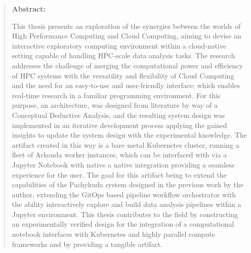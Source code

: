 \begin{abstract}
    \thispagestyle{kapitelkopfzeile}
    \textbf{Abstract:}

    This thesis presents an exploration of the synergies between the worlds of High
    Performance Computing and Cloud Computing, aiming to devise an interactive
    exploratory computing environment within a cloud-native setting capable of
    handling HPC-scale data analysis tasks.
    The research addresses the challenge of merging the computational power and
    efficiency of HPC systems with the versatility and flexibility of Cloud Computing
    and the need for an  easy-to-use and user-friendly interface;
    which enables real-time research in a familiar programming environment.
    For this purpose, an architecture, was designed from literature by way of
    a Conceptual Deductive Analysis, and the resulting system design was implemented
    in an iterative development process applying the gained insights to update
    the system design with the experimental knowledge.
    The artifact created in this way is a bare metal Kubernetes cluster, running
    a fleet of Arkouda worker instances, which can be interfaced with via a
    Jupyter Notebook with native a native integration providing a seamless
    experience for the user.
    The goal for this artifact being to extend the capabilities of the Pachykuda
    system designed in the previous work by the author, extending the
    GitOps based pipeline workflow orchestrator with the ability interactively
    explore and build data analysis pipelines within a Jupyter environment.
    This thesis contributes to the field by constructing an experimentally
    verified design for the integration of a computational notebook interfaces
    with Kubernetes and highly parallel compute frameworks and by providing a tangible artifact.


\end{abstract}